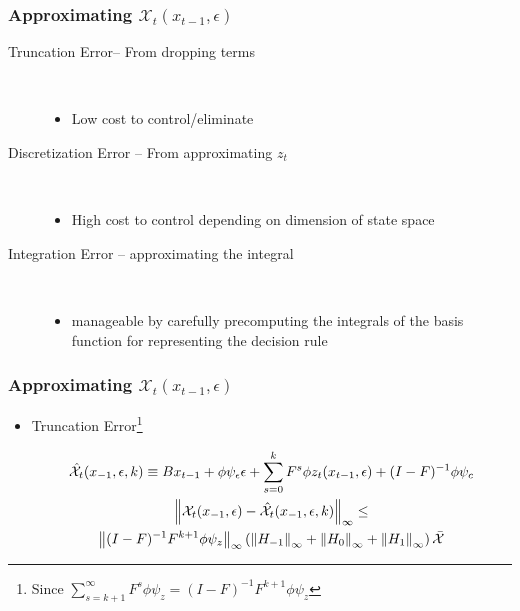\documentclass[tikz]{beamer}
\begin{document}
\begin{frame}
\frametitle{Approximating $\mathcal{X}_t(x_{t-1},\epsilon)$} 

{\small



\begin{description}
\item[Truncation Error-- From dropping terms] \ 
  \begin{itemize}
  \item Low cost to control/eliminate
  \end{itemize}
\item[Discretization Error -- From approximating $z_t$] \ 
  \begin{itemize}
\item High cost to control depending on dimension of state space
  \end{itemize}
\item[Integration Error -- approximating the integral] \ 
  \begin{itemize}
  \item manageable by carefully precomputing the integrals of the basis function
for representing the decision rule
   \end{itemize}


\end{description}
}
\end{frame}


\begin{frame}
\frametitle{Approximating $\mathcal{X}_t(x_{t-1},\epsilon)$} 

{\small


\begin{itemize}
\item Truncation Error\footnote{Since
$\sum_{s=k+1}^{\infty} F^s \phi \psi_z = (I -F)^{-1} F^{k+1}\phi \psi_z$}

 	 \begin{gather}
 	 \hat{\mathcal{X}}_{t}(x_{-1},\epsilon,k) \equiv B x_{t-1}+ \phi \psi_\epsilon\epsilon + \sum_{s=0}^k F^s \phi z_{t}(x_{t-1},\epsilon) + (I - F)^{-1} \phi \psi_c \label{theTruncSeries}\\
      \label{eq:1}
\left\lVert\mathcal{X}_{t}(x_{-1},\epsilon)-\hat{\mathcal{X}}_{t}(x_{-1},\epsilon,k)\right\rVert_\infty \le\\ \left\lVert(I -F)^{-1} F^{k+1}\phi \psi_z\right\rVert_\infty \left ( \left\lVert H_{-1} \right\rVert_\infty+ \left\lVert H_{0} \right\rVert_\infty+ \left\lVert H_{1} \right\rVert_\infty \right )\bar{\mathcal{X}}
    \end{gather}


\end{itemize}

}
\end{frame}
\end{document}
